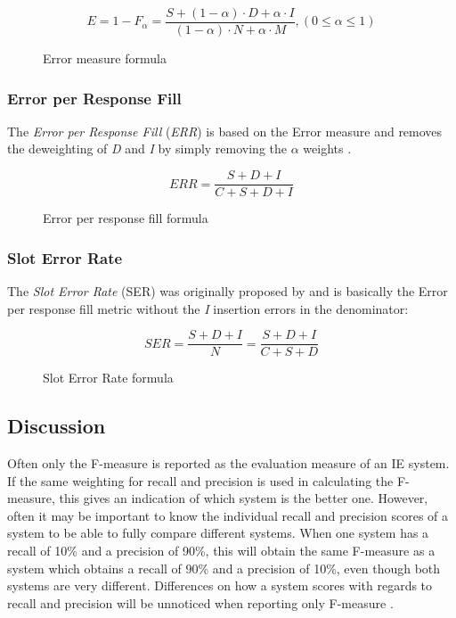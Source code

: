 \begin{figure}[H]
\begin{displaymath}
	E = 1 - F_\alpha = \frac{S + (1-\alpha) \cdot D + \alpha \cdot I}{(1-\alpha) \cdot N + \alpha \cdot M}, (0 \le \alpha \le 1)
\end{displaymath}
\caption{Error measure formula}
\label{eq:error-measure}
\end{figure}

\subsubsection{Error per Response Fill}
The \textit{Error per Response Fill} (\textit{ERR}) is based on the Error measure and removes the deweighting of \textit{D} and \textit{I} by simply removing the $\alpha$ weights \cite{Chinchor:1995}\cite{Makhoul:1999}.

\begin{figure}[H]
\begin{displaymath}
	ERR = \frac{S+D+I}{C+S+D+I}
\end{displaymath}
\caption{Error per response fill formula}
\label{eq:error-per-response-fill}
\end{figure}

\subsubsection{Slot Error Rate}
The \textit{Slot Error Rate} (SER) was originally proposed by \citeauthor{Makhoul:1999} \cite{Makhoul:1999} and is basically the Error per response fill metric without the \textit{I} insertion errors in the denominator:

\begin{figure}[H]
\begin{displaymath}
	SER = \frac{S+D+I}{N} = \frac{S+D+I}{C+S+D}
\end{displaymath}
\caption{Slot Error Rate formula}
\end{figure}

\subsection{Discussion}
Often only the F-measure is reported as the evaluation measure of an IE system. If the same weighting for recall and precision is used in calculating the F-measure, this gives an indication of which system is the better one. However, often it may be important to know the individual recall and precision scores of a system to be able to fully compare different systems. When one system has a recall of 10\% and a precision of 90\%, this will obtain the same F-measure as a system which obtains a recall of 90\% and a precision of 10\%, even though both systems are very different. Differences on how a system scores with regards to recall and precision will be unnoticed when reporting only F-measure \cite{Sitter:2004}.


